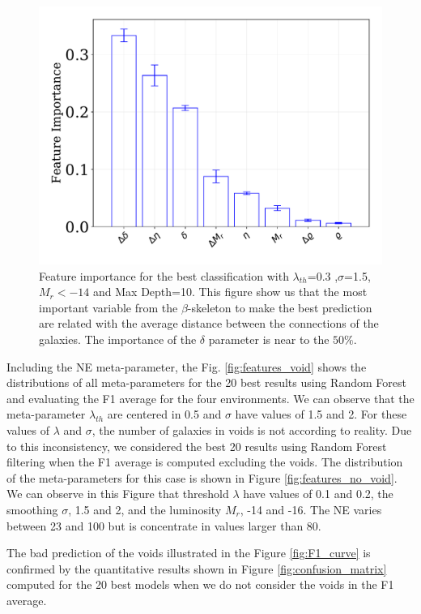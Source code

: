 \documentclass[usenatbib]{mnras}
\begin{document}
\begin{figure}
\centering
    \includegraphics[scale=0.4]{Figs/p_features_importance_20.pdf}  
    \caption{Feature importance for the best classification with $\lambda_{th}$=0.3 ,$\sigma$=1.5, $M_{r}<-14$ and Max Depth=10. This figure show us that the most important variable from the $\beta$-skeleton to make the best prediction are related with the average distance between the connections of the galaxies. The importance of the $\delta$ parameter is near to the $50\%$.}
    \label{fig:feature_importance}     
\end{figure}

Including the NE meta-parameter, the Fig. \ref{fig:features_void} shows the distributions of all meta-parameters for the 20 best results using Random Forest and evaluating the F1 average for the four environments. We can observe that the meta-parameter $\lambda_{th}$ are centered in 0.5 and $\sigma$ have values of 1.5 and 2. For these values of $\lambda$ and $\sigma$, the number of galaxies in voids is not according to reality. Due to this inconsistency, we considered the best 20 results using Random Forest filtering when the F1 average is computed excluding the voids. The distribution of the meta-parameters for this case is shown in Figure \ref{fig:features_no_void}. We can observe in this Figure that threshold $\lambda$ have values of 0.1 and 0.2, the smoothing $\sigma$, 1.5 and 2, and the luminosity $M_r$, -14 and -16. The NE varies between 23 and 100 but is concentrate in values larger than 80.

The bad prediction of the voids illustrated in the Figure \ref{fig:F1_curve} is confirmed by the quantitative results shown in Figure \ref{fig:confusion_matrix} computed for the 20 best models when we do not consider the voids in the F1 average. 
\end{document}
